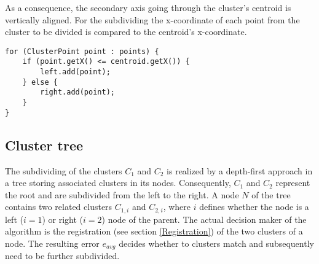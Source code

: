 As a consequence, the secondary axis going through the cluster's centroid is vertically aligned. For the subdividing the x-coordinate of each point from the cluster to be divided is compared to the centroid's x-coordinate.

\begin{lstlisting}
for (ClusterPoint point : points) {
	if (point.getX() <= centroid.getX()) {
		left.add(point);
	} else {
		right.add(point);
	}
}
\end{lstlisting}

\subsection{Cluster tree}
\label{tree}
The subdividing of the clusters $C_1$ and $C_2$ is realized by a depth-first approach in a tree storing associated clusters in its nodes. Consequently, $C_1$ and $C_2$ represent the root and are subdivided from the left to the right. A node $N$ of the tree contains two related clusters $C_{1,i}$ and $C_{2,i}$, where $i$ defines whether the node is a left ($i=1$) or right ($i=2$) node of the parent. The actual decision maker of the algorithm is the registration (see section \ref{Registration}) of the two clusters of a node. The resulting error $e_{avg}$ decides whether to clusters match and subsequently need to be further subdivided.

